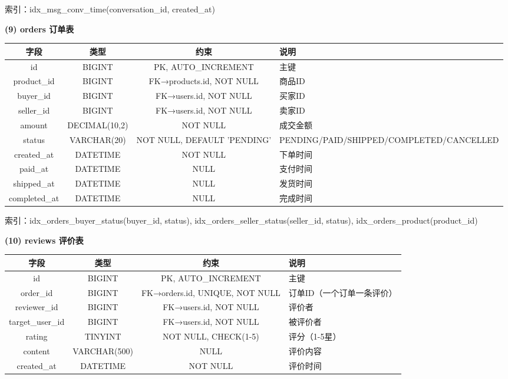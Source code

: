 \documentclass[12pt,a4paper]{ctexart}
\numberwithin{figure}{section}
\numberwithin{table}{section}
\begin{document}
索引：idx\_msg\_conv\_time(conversation\_id, created\_at)

\textbf{(9) orders 订单表}

\begin{center}
\renewcommand{\arraystretch}{1.3}
\small
\begin{tabular}{|c|c|c|p{5cm}|}
\hline
\rowcolor{tableheader}
\textbf{字段} & \textbf{类型} & \textbf{约束} & \textbf{说明} \\
\hline
id & BIGINT & PK, AUTO\_INCREMENT & 主键 \\
\hline
product\_id & BIGINT & FK→products.id, NOT NULL & 商品ID \\
\hline
buyer\_id & BIGINT & FK→users.id, NOT NULL & 买家ID \\
\hline
seller\_id & BIGINT & FK→users.id, NOT NULL & 卖家ID \\
\hline
amount & DECIMAL(10,2) & NOT NULL & 成交金额 \\
\hline
status & VARCHAR(20) & NOT NULL, DEFAULT 'PENDING' & PENDING/PAID/SHIPPED/COMPLETED/CANCELLED \\
\hline
created\_at & DATETIME & NOT NULL & 下单时间 \\
\hline
paid\_at & DATETIME & NULL & 支付时间 \\
\hline
shipped\_at & DATETIME & NULL & 发货时间 \\
\hline
completed\_at & DATETIME & NULL & 完成时间 \\
\hline
\end{tabular}
\end{center}

索引：idx\_orders\_buyer\_status(buyer\_id, status), idx\_orders\_seller\_status(seller\_id, status), idx\_orders\_product(product\_id)

\textbf{(10) reviews 评价表}

\begin{center}
\renewcommand{\arraystretch}{1.3}
\small
\begin{tabular}{|c|c|c|p{5cm}|}
\hline
\rowcolor{tableheader}
\textbf{字段} & \textbf{类型} & \textbf{约束} & \textbf{说明} \\
\hline
id & BIGINT & PK, AUTO\_INCREMENT & 主键 \\
\hline
order\_id & BIGINT & FK→orders.id, UNIQUE, NOT NULL & 订单ID（一个订单一条评价） \\
\hline
reviewer\_id & BIGINT & FK→users.id, NOT NULL & 评价者 \\
\hline
target\_user\_id & BIGINT & FK→users.id, NOT NULL & 被评价者 \\
\hline
rating & TINYINT & NOT NULL, CHECK(1-5) & 评分（1-5星） \\
\hline
content & VARCHAR(500) & NULL & 评价内容 \\
\hline
created\_at & DATETIME & NOT NULL & 评价时间 \\
\hline
\end{tabular}
\end{center}
\end{document}
